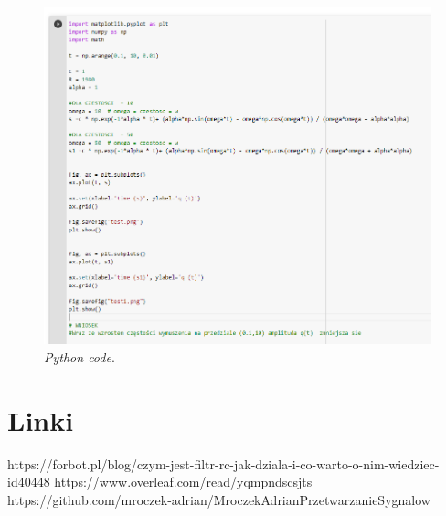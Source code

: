 \documentclass[12pt,oneside,a4paper]{book} %
\begin{document}
\begin{figure}[h]
\begin{center} 
\includegraphics[scale=0.6]{./images/002.PNG} 
\caption{\textit{Python code}.\newline }
\label{rys:logoup}
\end{center}
\end{figure}


\chapter{Linki }

https://forbot.pl/blog/czym-jest-filtr-rc-jak-dziala-i-co-warto-o-nim-wiedziec-id40448 \newline
https://www.overleaf.com/read/yqmpndscsjts \newline
https://github.com/mroczek-adrian/MroczekAdrianPrzetwarzanieSygnalow
\end{document}
